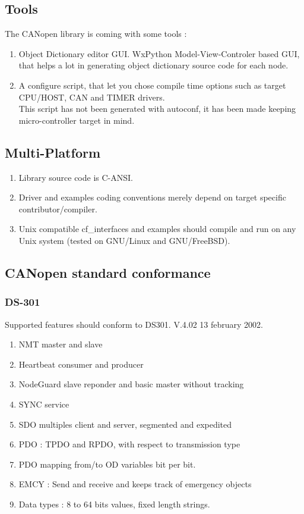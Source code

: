 \documentclass[12pt,english,a4paper]{book}
\newcommand{\canopen}{CANopen }
\begin{document}
\subsection{Tools }

The \canopen library is coming with some tools :

\begin{enumerate}
\item Object Dictionary editor GUI. WxPython Model-View-Controler based
GUI, that helps a lot in generating object dictionary source code for
each node. 
\item A configure script, that let you chose compile time options such as
target CPU/HOST, CAN and TIMER drivers.\\
 This script has not been generated with autoconf, it has been made
keeping micro-controller target in mind. 
\end{enumerate}

\subsection{Multi-Platform}

\begin{enumerate}
\item Library source code is C-ANSI. 
\item Driver and examples coding conventions merely depend on target specific
contributor/compiler. 
\item Unix compatible cf_interfaces and examples should compile and run on
any Unix system (tested on GNU/Linux and GNU/FreeBSD). 
\end{enumerate}

\subsection{\canopen standard conformance}

\subsubsection{DS-301}

Supported features should conform to DS301. V.4.02 13 february 2002. 

\begin{enumerate}
\item NMT master and slave
\item Heartbeat consumer and producer
\item NodeGuard slave reponder and basic master without tracking
\item SYNC service
\item SDO multiples client and server, segmented and expedited
\item PDO : TPDO and RPDO, with respect to transmission type
\item PDO mapping from/to OD variables bit per bit. 
\item EMCY : Send and receive and keeps track of emergency objects
\item Data types : 8 to 64 bits values, fixed length strings.
\end{enumerate}
\end{document}
